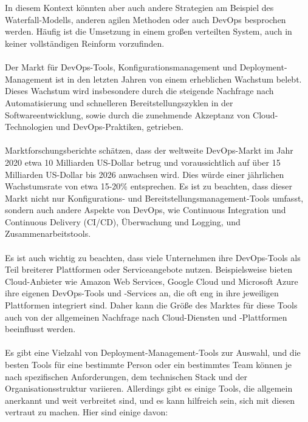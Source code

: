 \\\\ 
In diesem Kontext könnten aber auch andere Strategien am Beispiel des Waterfall-Modells, anderen agilen Methoden oder auch DevOps besprochen werden. Häufig ist die Umsetzung in einem großen verteilten System, auch in keiner vollständigen Reinform vorzufinden.
\\\\
Der Markt für DevOps-Tools, Konfigurationsmanagement und Deployment-Management ist in den letzten Jahren von einem erheblichen Wachstum belebt. Dieses Wachstum wird insbesondere durch die steigende Nachfrage nach Automatisierung und schnelleren Bereitstellungszyklen in der Softwareentwicklung, sowie durch die zunehmende Akzeptanz von Cloud-Technologien und DevOps-Praktiken, getrieben.
\\\\
Marktforschungsberichte schätzen, dass der weltweite DevOps-Markt im Jahr 2020 etwa 10 Milliarden US-Dollar betrug und voraussichtlich auf über 15 Milliarden US-Dollar bis 2026 anwachsen wird. Dies würde einer jährlichen Wachstumsrate von etwa 15-20\% entsprechen. Es ist zu beachten, dass dieser Markt nicht nur Konfigurations- und Bereitstellungsmanagement-Tools umfasst, sondern auch andere Aspekte von DevOps, wie Continuous Integration und Continuous Delivery (CI/CD), Überwachung und Logging, und Zusammenarbeitstools.
\\\\
Es ist auch wichtig zu beachten, dass viele Unternehmen ihre DevOps-Tools als Teil breiterer Plattformen oder Serviceangebote nutzen. Beispielsweise bieten Cloud-Anbieter wie Amazon Web Services, Google Cloud und Microsoft Azure ihre eigenen DevOps-Tools und -Services an, die oft eng in ihre jeweiligen Plattformen integriert sind. Daher kann die Größe des Marktes für diese Tools auch von der allgemeinen Nachfrage nach Cloud-Diensten und -Plattformen beeinflusst werden.
\\\\
Es gibt eine Vielzahl von Deployment-Management-Tools zur Auswahl, und die besten Tools für eine bestimmte Person oder ein bestimmtes Team können je nach spezifischen Anforderungen, dem technischen Stack und der Organisationsstruktur variieren. Allerdings gibt es einige Tools, die allgemein anerkannt und weit verbreitet sind, und es kann hilfreich sein, sich mit diesen vertraut zu machen. Hier sind einige davon:
